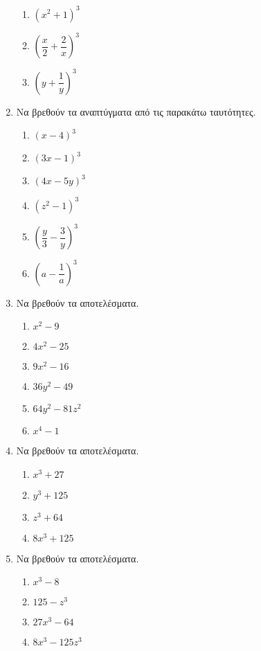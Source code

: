 \documentclass[twoside,nofonts,internet]{askhseis}
\begin{document}
\begin{enumerate}
\begin{multicols}{3}
\begin{enumerate}[label=\roman*.]
\item $ \left(x^2+1 \right)^3 $
\item $ \left(\dfrac{x}{2}+\dfrac{2}{x} \right)^3 $
\item $ \left(y+\dfrac{1}{y}\right)^3 $
\end{enumerate}
\end{multicols}
\item Να βρεθούν τα αναπτύγματα από τις παρακάτω ταυτότητες.
\begin{multicols}{3}
\begin{enumerate}[label=\roman*.]
\item $ \left(x-4 \right)^3 $
\item $ \left(3x-1 \right)^3 $
\item $ \left(4x-5y \right)^3 $
\item $ \left(z^2-1 \right)^3 $
\item $ \left(\dfrac{y}{3}-\dfrac{3}{y} \right)^3 $
\item $ \left(a-\dfrac{1}{a}\right)^3 $
\end{enumerate}
\end{multicols}
\item Να βρεθούν τα αποτελέσματα.
\begin{multicols}{3}
\begin{enumerate}[label=\roman*.]
\item $ x^2-9 $
\item $ 4x^2-25 $
\item $ 9x^2-16 $
\item $ 36y^2-49 $
\item $ 64y^2-81z^2 $
\item $ x^4-1 $
\end{enumerate}
\end{multicols}
\newpage
\noindent
\item Να βρεθούν τα αποτελέσματα.
\begin{multicols}{2}
\begin{enumerate}[label=\roman*.]
\item $ x^3+27 $
\item $ y^3+125 $
\item $ z^3+64 $
\item $ 8x^3+125 $
\end{enumerate}
\end{multicols}
\item Να βρεθούν τα αποτελέσματα.
\begin{multicols}{3}
\begin{enumerate}[label=\roman*.]
\item $ x^3-8 $
\item $ 125-z^3 $
\item $ 27x^3-64 $
\item $ 8x^3-125z^3 $
\end{enumerate}
\end{multicols}
\end{enumerate}
\end{document}
